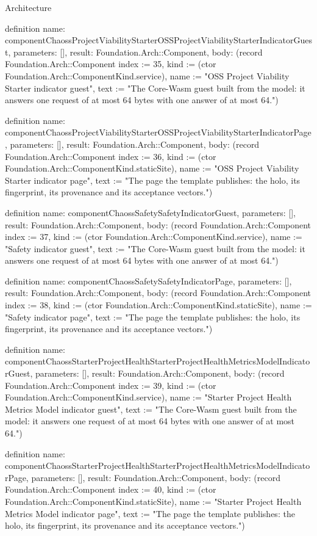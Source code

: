 \begin{lexlean}{Architecture}
\begin{semanticmodule}
definition{
  name: componentChaossProjectViabilityStarterOSSProjectViabilityStarterIndicatorGuest,
  parameters: [],
  result: Foundation.Arch::Component,
  body: (record Foundation.Arch::Component {index := 35, kind := (ctor Foundation.Arch::ComponentKind.service), name := "OSS Project Viability Starter indicator guest", text := "The Core-Wasm guest built from the model: it answers one request of at most 64 bytes with one answer of at most 64."})
}

definition{
  name: componentChaossProjectViabilityStarterOSSProjectViabilityStarterIndicatorPage,
  parameters: [],
  result: Foundation.Arch::Component,
  body: (record Foundation.Arch::Component {index := 36, kind := (ctor Foundation.Arch::ComponentKind.staticSite), name := "OSS Project Viability Starter indicator page", text := "The page the template publishes: the holo, its fingerprint, its provenance and its acceptance vectors."})
}

definition{
  name: componentChaossSafetySafetyIndicatorGuest,
  parameters: [],
  result: Foundation.Arch::Component,
  body: (record Foundation.Arch::Component {index := 37, kind := (ctor Foundation.Arch::ComponentKind.service), name := "Safety indicator guest", text := "The Core-Wasm guest built from the model: it answers one request of at most 64 bytes with one answer of at most 64."})
}

definition{
  name: componentChaossSafetySafetyIndicatorPage,
  parameters: [],
  result: Foundation.Arch::Component,
  body: (record Foundation.Arch::Component {index := 38, kind := (ctor Foundation.Arch::ComponentKind.staticSite), name := "Safety indicator page", text := "The page the template publishes: the holo, its fingerprint, its provenance and its acceptance vectors."})
}

definition{
  name: componentChaossStarterProjectHealthStarterProjectHealthMetricsModelIndicatorGuest,
  parameters: [],
  result: Foundation.Arch::Component,
  body: (record Foundation.Arch::Component {index := 39, kind := (ctor Foundation.Arch::ComponentKind.service), name := "Starter Project Health Metrics Model indicator guest", text := "The Core-Wasm guest built from the model: it answers one request of at most 64 bytes with one answer of at most 64."})
}

definition{
  name: componentChaossStarterProjectHealthStarterProjectHealthMetricsModelIndicatorPage,
  parameters: [],
  result: Foundation.Arch::Component,
  body: (record Foundation.Arch::Component {index := 40, kind := (ctor Foundation.Arch::ComponentKind.staticSite), name := "Starter Project Health Metrics Model indicator page", text := "The page the template publishes: the holo, its fingerprint, its provenance and its acceptance vectors."})
}


\end{semanticmodule}
\end{lexlean}
